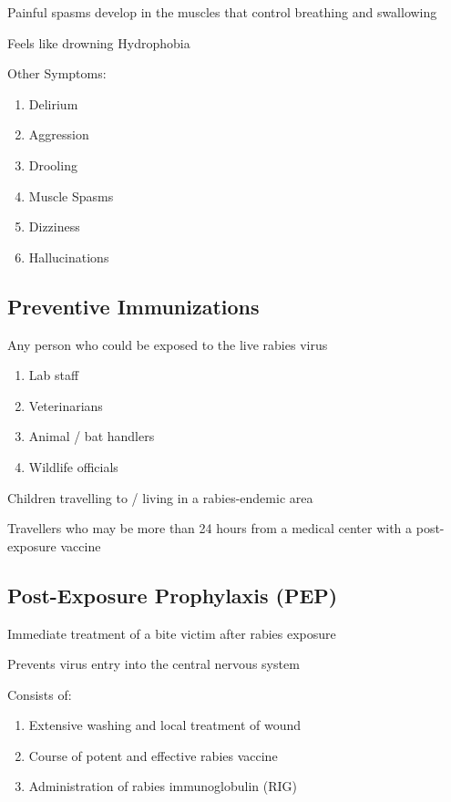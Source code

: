 \documentclass{notes}
\begin{document}
Painful spasms develop in the muscles that control breathing and swallowing

\tab Feels like drowning \indicates Hydrophobia

Other Symptoms:

\begin{enumerate}
    \item Delirium
    \item Aggression
    \item Drooling
    \item Muscle Spasms
    \item Dizziness
    \item Hallucinations
\end{enumerate}

\subsection{Preventive Immunizations}

Any person who could be exposed to the live rabies virus

\begin{enumerate}
    \item Lab staff
    \item Veterinarians
    \item Animal / bat handlers
    \item Wildlife officials
\end{enumerate}

Children travelling to / living in a rabies-endemic area

Travellers who may be more than 24 hours from a medical center with a post-exposure vaccine

\subsection{Post-Exposure Prophylaxis (PEP)}

Immediate treatment of a bite victim after rabies exposure

Prevents virus entry into the central nervous system

Consists of:

\begin{enumerate}
    \item Extensive washing and local treatment of wound
    \item Course of potent and effective rabies vaccine
    \item Administration of rabies immunoglobulin (RIG)
\end{enumerate}
\end{document}
